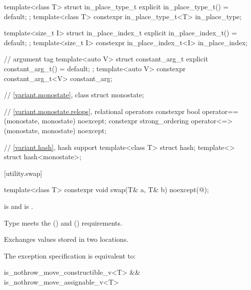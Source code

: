 \begin{codeblock}
{  template<class T>
    struct in_place_type_t {
      explicit in_place_type_t() = default;
    };
  template<class T> constexpr in_place_type_t<T> in_place_type{};

  template<size_t I>
    struct in_place_index_t {
      explicit in_place_index_t() = default;
    };
  template<size_t I> constexpr in_place_index_t<I> in_place_index{};

  //  argument tag%
%
  template<auto V>
    struct constant_arg_t {
      explicit constant_arg_t() = default;
    };
  template<auto V> constexpr constant_arg_t<V> constant_arg{};

  // \ref{variant.monostate}, class %
  struct monostate;

  // \ref{variant.monostate.relops},  relational operators%
%
  constexpr bool operator==(monostate, monostate) noexcept;
  constexpr strong_ordering operator<=>(monostate, monostate) noexcept;

  // \ref{variant.hash}, hash support%
  template<class T> struct hash;
  template<> struct hash<monostate>;
}
\end{codeblock}

[utility.swap]{}

%
\begin{itemdecl}
template<class T>
  constexpr void swap(T& a, T& b) noexcept(@\seebelow@);
\end{itemdecl}

\begin{itemdescr}
\pnum
\constraints
{} is  and
 is .

\pnum
\expects
Type
meets the
 ()
and
 ()
requirements.

\pnum
\effects
Exchanges values stored in two locations.

\pnum
\remarks
The exception specification is equivalent to:

\begin{codeblock}
is_nothrow_move_constructible_v<T> && is_nothrow_move_assignable_v<T>
\end{codeblock}
\end{itemdescr}

